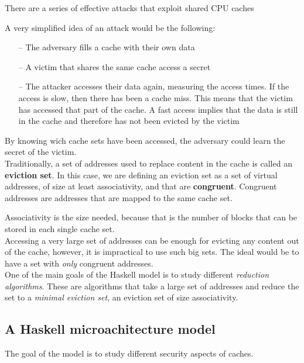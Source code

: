 \documentclass[11pt]{article}
\begin{document}
There are a series of effective attacks that exploit shared CPU caches \cite{liu2015last, yarom2014flush}

A very simplified idea of an attack would be the following:
\begin{itemize}
\item[--] The adversary fills a cache with their own data
\item[--] A victim that shares the same cache access a secret
\item[--] The attacker accesses their data again, measuring the access times. If the access is slow, then there has been a cache miss. This means that the victim has accessed that part of the cache. A fast access implies that the data is still in the cache and therefore has not been evicted by the victim
\end{itemize}

By knowing wich cache sets have been accessed, the adversary could learn the secret of the victim.\\

Traditionally, a set of addresses used to replace content in the cache is called an \textbf{eviction set}. In this case, we are defining an eviction set as a set of virtual addresses, of size at least associativity, and that are \textbf{congruent}. Congruent addresses are addresses that are mapped to the same cache set.

Associativity is the size needed, because that is the number of blocks that can be stored in each single cache set.\\

Accessing a very large set of addresses can be enough for evicting any content out of the cache, however, it is impractical to use such big sets. The ideal would be to have a set with \emph{only} congruent addresses.\\

One of the main goals of the Haskell model is to study different \emph{reduction algorithms}. These are algorithms that take a large set of addresses and reduce the set to a \emph{minimal eviction set}, an eviction set of size associativity.\\

\subsection{A Haskell microachitecture model}

The goal of the model is to study different security aspects of caches.
\end{document}
